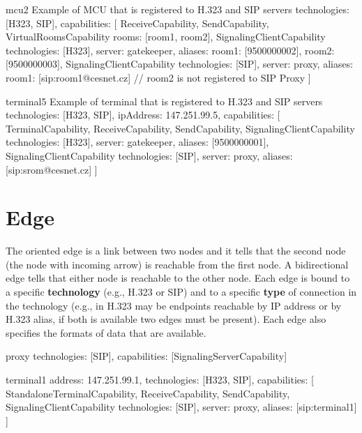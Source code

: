 \begin{itemize}
\begin{ResourceExample}{}{mcu2}%
      {Example of MCU that is registered to H.323 and SIP servers}
technologies: [H323, SIP],
capabilities: [
  ReceiveCapability,
  SendCapability,
  VirtualRoomsCapability {rooms: [room1, room2]},
  SignalingClientCapability {technologies: [H323], server: gatekeeper,
    aliases: {room1: [9500000002], room2: [9500000003]}},
  SignalingClientCapability {technologies: [SIP], server: proxy,
    aliases: {room1: [sip:room1@cesnet.cz]}} 
     // room2 is not registered to SIP Proxy
]
\end{ResourceExample}

\begin{ResourceExample}{}{terminal5}%
      {Example of terminal that is registered to H.323 and SIP servers}
technologies: [H323, SIP],
ipAddress: 147.251.99.5,
capabilities: [
  TerminalCapability,
  ReceiveCapability,
  SendCapability,
  SignalingClientCapability {technologies: [H323], server: gatekeeper,
    aliases: [9500000001]},
  SignalingClientCapability {technologies: [SIP], server: proxy,
    aliases: [sip:srom@cesnet.cz]}
]
\end{ResourceExample}

\end{itemize}
 

\section{Edge}

The oriented edge is a link between two nodes and it tells that the second 
node (the node with incoming arrow) is reachable from the first node. A 
bidirectional edge tells that either node is reachable to the other node. 
Each edge is bound to a specific \textbf{technology} (e.g., H.323 or SIP) and 
to a specific \textbf{type} of connection in the technology (e.g., in H.323 
may be endpoints reachable by IP address or by H.323 alias, if both is 
available two edges must be present). Each edge also specifies the formats of data that are available.

\begin{ResourceExample}{}{proxy}{}
technologies: [SIP],
capabilities: [SignalingServerCapability]
\end{ResourceExample}

\begin{ResourceExample}{}{terminal1}{}
address: 147.251.99.1,
technologies: [H323, SIP],
capabilities: [
  StandaloneTerminalCapability,
  ReceiveCapability,
  SendCapability,
  SignalingClientCapability {technologies: [SIP], server: proxy, 
    aliases: [sip:terminal1]}
]
\end{ResourceExample}

